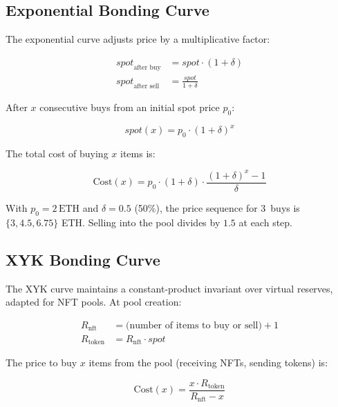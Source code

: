 \subsection{Exponential Bonding Curve}

The exponential curve adjusts price by a multiplicative factor:

\begin{align}
\mathit{spot}_{\text{after buy}} &= \mathit{spot} \cdot (1 + \delta)
  \label{eq:exp-buy} \\
\mathit{spot}_{\text{after sell}} &= \frac{\mathit{spot}}{1 + \delta}
  \label{eq:exp-sell}
\end{align}

After $x$ consecutive buys from an initial spot price $p_0$:

\begin{equation}\label{eq:exp-multi}
\mathit{spot}(x) = p_0 \cdot (1+\delta)^x
\end{equation}

The total cost of buying $x$ items is:

\begin{equation}
\text{Cost}(x) = p_0 \cdot (1+\delta) \cdot
\frac{(1+\delta)^x - 1}{\delta}
\end{equation}

\begin{remark}
With $p_0 = 2\,\text{ETH}$ and $\delta = 0.5$ (50\%), the price
sequence for 3~buys is $\{3, 4.5, 6.75\}$ ETH. Selling into the
pool divides by $1.5$ at each step.
\end{remark}

\subsection{XYK Bonding Curve}

The XYK curve maintains a constant-product invariant over virtual
reserves, adapted for NFT pools. At pool creation:

\begin{align}
R_{\text{nft}} &= \text{(number of items to buy or sell)} + 1
  \label{eq:xyk-nft} \\
R_{\text{token}} &= R_{\text{nft}} \cdot \mathit{spot}
  \label{eq:xyk-token}
\end{align}

The price to buy $x$ items from the pool (receiving NFTs, sending
tokens) is:

\begin{equation}\label{eq:xyk-buy}
\text{Cost}(x) = \frac{x \cdot R_{\text{token}}}{R_{\text{nft}} - x}
\end{equation}

